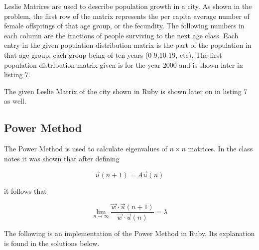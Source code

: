 \documentclass[letterpaper,12pt]{article}
\begin{document}
Leslie Matrices are used to describe population growth in a city.
As shown in the problem, the first row of the matrix represents the per capita
average number of female offsprings of that age group, or the fecundity.
The following numbers in each column are the fractions of people surviving to the
next age class.
Each entry in the given population distribution matrix is the part of the
population in that age group, each group being of ten years (0-9,10-19, etc).
The first population distribution matrix given is for the year 2000 and is shown
later in listing 7.

The given Leslie Matrix of the city shown in Ruby is shown later on in listing 7 as well.

\subsection{Power Method}

The Power Method is used to calculate eigenvalues of $n \times n$ matrices.
In the class notes it was shown that after defining 

\[\vec{u}(n+1) = A\vec{u}(n)\]

it follows that

\[\lim_{n\to\infty} \frac{{\vec{w}} \cdot {\vec{u}(n+1)}}{ {\vec{w}} \cdot {\vec{u}(n)}} =\lambda\]

The following is an implementation of the Power Method in Ruby.
Its explanation is found in the solutions below.
\end{document}
